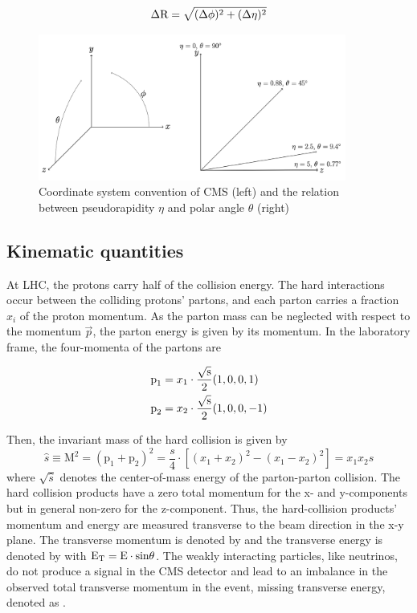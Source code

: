 \begin{equation}
  \Delta \text{R}=\sqrt{(\Delta \phi)^{2}+(\Delta \eta)^{2}}
\end{equation}

\begin{figure}[htbp]
  \centering
  \includegraphics[width=0.9\textwidth]{plots/chapter3/coordinate.png}
  \caption{Coordinate system convention of CMS (left) and the relation between pseudorapidity $\eta$ and polar angle $\theta$ (right)}
  \label{fig:coordinate}
\end{figure}

\subsection{Kinematic quantities}
At LHC, the protons carry half of the collision energy. The hard interactions occur between the colliding protons' partons, and each parton carries a fraction $x_i$ of the proton momentum. As the parton mass can be neglected with respect to the momentum $\vec{p}$, the parton energy is given by its momentum. In the laboratory frame, the four-momenta of the partons are

\begin{equation}
  \begin{aligned}
    \text{p}_{1}&=x_{1} \cdot \frac{\sqrt{\text{s}}}{2}(1,0,0,1) \\
    \text{p}_{2}&=x_{2} \cdot \frac{\sqrt{\text{s}}}{2}(1,0,0,-1)
  \end{aligned}
\end{equation}

Then, the invariant mass of the hard collision is given by
%
\begin{equation}
  \hat{s} \equiv \text{M}^{2}=\left(\text{p}_{1}+\text{p}_{2}\right)^{2}=\frac{s}{4} \cdot\left[\left(x_{1}+x_{2}\right)^{2}-\left(x_{1}-x_{2}\right)^{2}\right]=x_{1} x_{2} s
\end{equation}
%
where $\sqrt{\hat{s}}$ denotes the center-of-mass energy of the parton-parton collision. The hard collision products have a zero total momentum for the x- and y-components but in general non-zero for the z-component. Thus, the hard-collision products' momentum and energy are measured transverse to the beam direction in the x-y plane. The transverse momentum is denoted by \pt and the transverse energy is denoted by \ET with $\text{E}_\text{T} = \text{E} \cdot \text{sin} \theta$. The weakly interacting particles, like neutrinos, do not produce a signal in the CMS detector and lead to an imbalance in the observed total transverse momentum in the event, missing transverse energy, denoted as \met.

